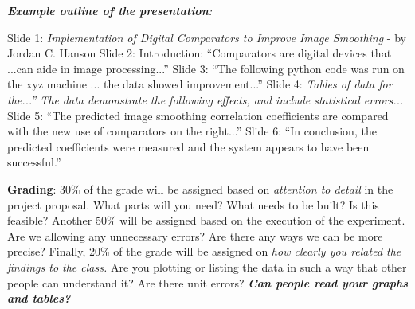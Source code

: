 \documentclass[10pt]{article}
\begin{document}
\textit{\textbf{Example outline of the presentation}:}
\begin{outline}[enumerate]
\1 Slide 1: \textit{Implementation of Digital Comparators to Improve Image Smoothing} - by Jordan C. Hanson
\1 Slide 2: Introduction: ``Comparators are digital devices that ...can aide in image processing...''
\1 Slide 3: ``The following python code was run on the xyz machine ... the data showed improvement...''
\1 Slide 4: \textit{Tables of data for the...'' The data demonstrate the following effects, and include statistical errors...}
\1 Slide 5: ``The predicted image smoothing correlation coefficients are compared with the new use of comparators on the right...''
\1 Slide 6: ``In conclusion, the predicted coefficients were measured and the system appears to have been successful.''
\end{outline}
\textbf{Grading}: 30\% of the grade will be assigned based on \textit{attention to detail} in the project proposal.  What parts will you need?  What needs to be built?  Is this feasible?  Another 50\% will be assigned based on the execution of the experiment.  Are we allowing any unnecessary errors?  Are there any ways we can be more precise?  Finally, 20\% of the grade will be assigned on \textit{how clearly you related the findings to the class.}  Are you plotting or listing the data in such a way that other people can understand it?  Are there unit errors?  \textbf{\textit{Can people read your graphs and tables?}}
\end{document}
